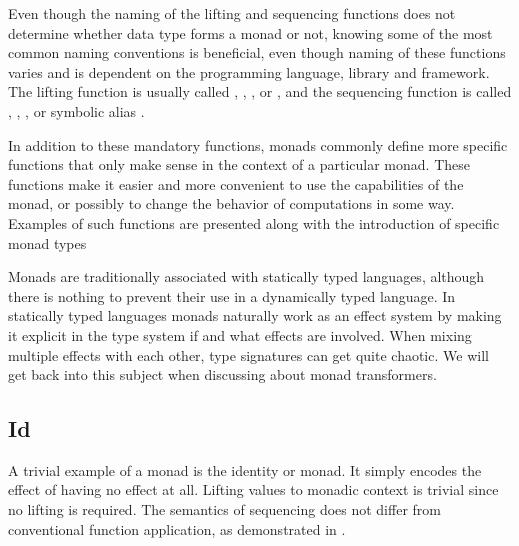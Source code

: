 

Even though the naming of the lifting and sequencing functions does not determine whether data type forms a monad or not, knowing some of the most common naming conventions is beneficial, even though naming of these functions varies and is dependent on the programming language, library and framework. The lifting function is usually called , , , or , and the sequencing function is called , , , or symbolic alias \inlinecode{>>=}.

In addition to these mandatory functions, monads commonly define more specific functions that only make sense in the context of a particular monad. These functions make it easier and more convenient to use the capabilities of the monad, or possibly to change the behavior of computations in some way. Examples of such functions are presented along with the introduction of specific monad types

Monads are traditionally associated with statically typed languages, although there is nothing to prevent their use in a dynamically typed language. In statically typed languages monads naturally work as an effect system by making it explicit in the type system if and what effects are involved. When mixing multiple effects with each other, type signatures can get quite chaotic. We will get back into this subject when discussing about monad transformers.


\subsection{Id}
A trivial example of a monad is the identity or  monad. It simply encodes the effect of having no effect at all. Lifting values to monadic context is trivial since no lifting is required. The semantics of sequencing does not differ from conventional function application, as demonstrated in .




